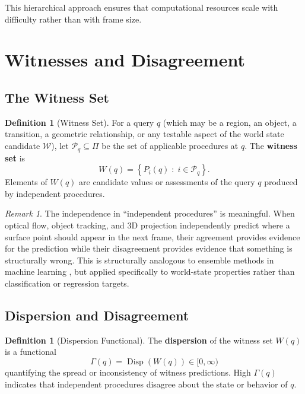 \documentclass[11pt,a4paper]{article}
\theoremstyle{plain}
\theoremstyle{definition}
\newtheorem{definition}[theorem]{Definition}
\theoremstyle{remark}
\newtheorem{remark}[theorem]{Remark}
\DeclareMathOperator{\Disp}{Disp}
\begin{document}
This hierarchical approach ensures that computational resources scale with difficulty rather than with frame size.

\section{Witnesses and Disagreement}
\label{sec:witnesses}

\subsection{The Witness Set}

\begin{definition}[Witness Set]
For a query $q$ (which may be a region, an object, a transition, a geometric relationship, or any testable aspect of the world state candidate $\hat{\mathcal{W}}$), let $\mathcal{P}_q \subseteq \Pi$ be the set of applicable procedures at $q$. The \textbf{witness set} is
\[
W(q) = \left\{ P_i(q) \;:\; i \in \mathcal{P}_q \right\}.
\]
Elements of $W(q)$ are candidate values or assessments of the query $q$ produced by independent procedures.
\end{definition}

\begin{remark}
The independence in ``independent procedures'' is meaningful. When optical flow, object tracking, and 3D projection independently predict where a surface point should appear in the next frame, their agreement provides evidence for the prediction while their disagreement provides evidence that something is structurally wrong. This is structurally analogous to ensemble methods in machine learning \cite{lakshminarayanan2017deep}, but applied specifically to world-state properties rather than classification or regression targets.
\end{remark}

\subsection{Dispersion and Disagreement}

\begin{definition}[Dispersion Functional]
The \textbf{dispersion} of the witness set $W(q)$ is a functional
\[
\Gamma(q) = \Disp(W(q)) \in [0, \infty)
\]
quantifying the spread or inconsistency of witness predictions. High $\Gamma(q)$ indicates that independent procedures disagree about the state or behavior of $q$.
\end{definition}
\end{document}
